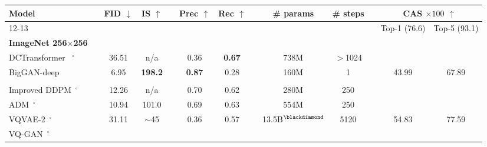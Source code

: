 
\begin{table}[h]
\small
    \centering
    {\small
    \begin{tabular}{lc ccc ccc ccc cc}
    \toprule
     {Model} & 
    
     & {FID}  $\downarrow$ & {IS}  $\uparrow$ & 
     &  {Prec}  $\uparrow$ & {Rec}   $\uparrow$ &
     
     &{\# params} & {\# steps} &
     
     & \multicolumn{2}{c}{{CAS $\times 100$} $\uparrow$}  
     \\
     \cline{12-13}
    &&  && & &&& & && {Top-1 (76.6)} & {Top-5 (93.1)} \\[-7pt]
    \textbf{ImageNet 256$\times$256} && &&& &&& &&& &
    \\[-2pt]
    \midrule
    

     
    DCTransformer~\cite{nash2021generating} $^\square$ &
    & 36.51 & n/a &
    & 0.36 & \textbf{0.67} &
    & 738M & $>$1024 &   & &
     \\ 
    
    BigGAN-deep~\cite{biggan}  & %
    & 6.95 & \bfseries{198.2} &
    & \textbf{0.87} & 0.28 &
    & 160M & 1 & & 43.99 &67.89 \\
    \\
    
    Improved DDPM~\cite{nichol2021improved}$^\square$  &
    & 12.26 & n/a  &
    & 0.70 & 0.62 &
     & 280M & 250  &  &  & \\
    
    ADM~\cite{dhariwal2021diffusion}$^\square$   & 
    & 10.94 & 101.0  &
    & 0.69 & 0.63 &
    & 554M & 250 &  &  & \\
    

    
    VQVAE-2~\cite{Razavi19vqvae2}$^\square$ &
    & 31.11 & $\sim$45 &
    & 0.36 & 0.57 &
    & 13.5B$^{\blackdiamond}$ & 5120 & & 54.83 & 77.59 \\
    \midrule
    VQ-GAN~\cite{Esser21vqgan}$^\square$ &
    

\end{tabular}}
\end{table}
